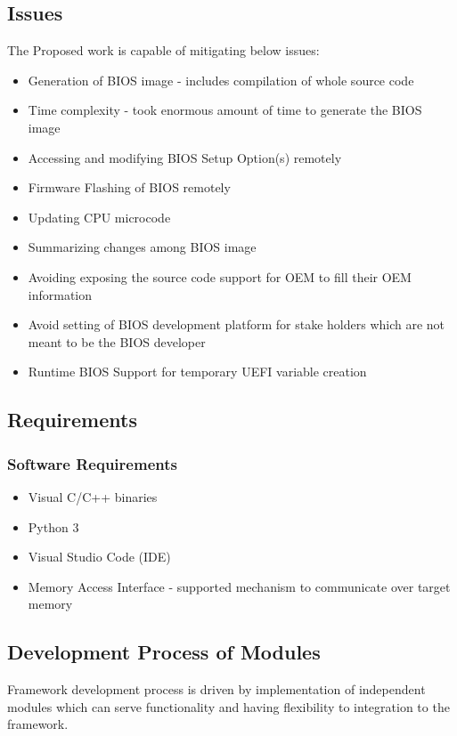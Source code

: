 \subsection{Issues}\label{subsection-issues}
The Proposed work is capable of mitigating below issues:
\begin{itemize}
	\item Generation of BIOS image - includes compilation of whole source code
	\item Time complexity - took enormous amount of time to generate the BIOS image
	\item Accessing and modifying BIOS Setup Option(s) remotely
	\item Firmware Flashing of BIOS remotely
	\item Updating CPU microcode
	\item Summarizing changes among BIOS image
	\item Avoiding exposing the source code support for OEM to fill their OEM information
	\item Avoid setting of BIOS development platform for stake holders which are not meant to be the BIOS developer
	\item Runtime BIOS Support for temporary UEFI variable creation
\end{itemize}

\subsection{Requirements}\label{subsection-requirements}
\subsubsection{Software Requirements}
\begin{itemize}
	\item Visual C/C++ binaries
	\item Python 3
	\item Visual Studio Code (IDE)
	\item Memory Access Interface - supported mechanism to communicate over target memory
\end{itemize}

\subsection{Development Process of Modules}
Framework development process is driven by implementation of independent modules which can serve functionality and having flexibility to integration to the framework.


